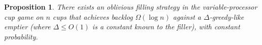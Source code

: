 \documentclass[twocolumn]{article}[10pt]
\newtheorem{proposition}{Proposition}
\begin{document}



\begin{proposition}
  \label{prop:obliviousBase}
  There exists an oblivious filling strategy in the variable-processor cup game
  on $n$ cups that achieves backlog $\Omega(\log n)$ against a
  $\Delta$-greedy-like emptier (where $\Delta \le O(1)$ is a constant known
  to the filler), with constant probability.
\end{proposition}
\end{document}
